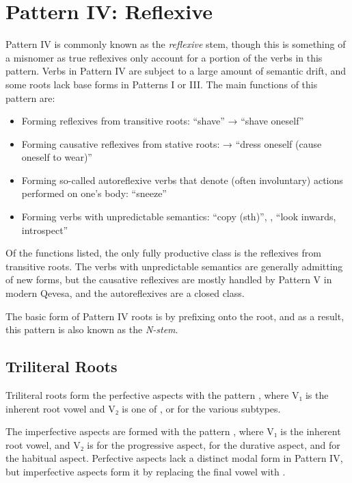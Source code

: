 \documentclass[grammar]{subfiles}
\begin{document}
\clearpage
\section{Pattern IV: Reflexive}
\label{sec:vm:pattern_iv}

Pattern IV is commonly known as the \emph{reflexive} stem, though this is
something of a misnomer as true reflexives only account for a portion of the
verbs in this pattern.  Verbs in Pattern IV are subject to a large amount of
semantic drift, and some roots lack base forms in Patterns I or III.  The main
functions of this pattern are: 

\begin{itemize}
  \item Forming reflexives from transitive roots:  “shave” → 
    “shave oneself”
  \item Forming causative reflexives from stative roots:  →
     “dress oneself (cause oneself to wear)”
  \item Forming so-called autoreflexive verbs that denote (often involuntary)
    actions performed on one’s body:  “sneeze”
  \item Forming verbs with unpredictable semantics:  “copy (sth)”,
    ,  “look inwards, introspect”
\end{itemize}

Of the functions listed, the only fully productive class is the reflexives from
transitive roots.  The verbs with unpredictable semantics are generally
admitting of new forms, but the causative reflexives are mostly handled by
Pattern V in modern Qevesa, and the autoreflexives are a closed class.

The basic form of Pattern IV roots is by prefixing  onto the root, and as
a result, this pattern is also known as the \emph{N-stem}.


\subsection{Triliteral Roots}
\label{ssec:vm:iv_triliteral_roots}

Triliteral roots form the perfective aspects with the pattern ,
where V₁ is the inherent root vowel and V₂ is one of ,  or 
for the various subtypes.  

The imperfective aspects are formed with the pattern ,
where V₁ is the inherent root vowel, and V₂ is  for the progressive
aspect,  for the durative aspect, and  for the habitual aspect.
Perfective aspects lack a distinct modal form in Pattern IV, but imperfective
aspects form it by replacing the final vowel with . 
\end{document}
